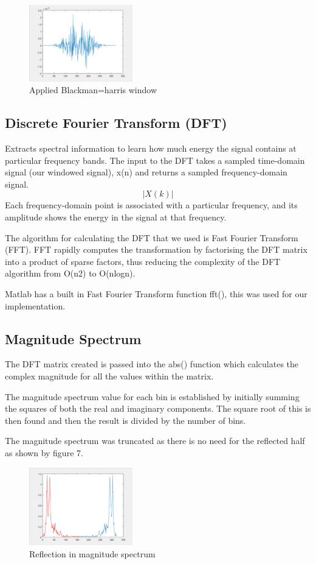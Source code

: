 \documentclass[	DIV=calc,%
							paper=a4,%
							fontsize=9.8pt,%
							twocolumn]{scrartcl}	 					%
\begin{document}
\begin{figure}[ht]
	\centering
	\includegraphics[width=0.4\textwidth]{blackman}
	\captionsetup{justification=centering}
	\caption{Applied Blackman=harris window}
\end{figure}
\subsection{Discrete Fourier Transform (DFT)}
Extracts spectral information to learn how much energy the signal contains at particular frequency bands.
The input to the DFT takes a sampled time-domain signal (our windowed signal), x(n) and returns a sampled frequency-domain signal. \[|X(k)|\]Each frequency-domain point is associated with a particular frequency, and its amplitude shows the energy in the signal at that frequency.

The algorithm for calculating the DFT that we used is Fast Fourier Transform (FFT). FFT rapidly computes the transformation by factorising the DFT matrix into  a product of sparse factors, thus reducing the complexity of the DFT algorithm from O(n2) to O(nlogn).   

Matlab has a built in Fast Fourier Transform function fft(), this was used for our implementation. 

\subsection{Magnitude Spectrum}
The DFT matrix created is passed into the abs() function which calculates the complex magnitude for all the values within the matrix.

The magnitude spectrum value for each bin is established by initially summing the squares of both the real and imaginary components. The square root of this is then found and then the result is divided by the number of bins.

The magnitude spectrum was truncated as there is no need for the reflected half as shown by figure 7.
\begin{figure}[ht]
	\centering
	\includegraphics[width=0.4\textwidth]{mag}
	\captionsetup{justification=centering}
	\caption{Reflection in magnitude spectrum}
\end{figure}
\end{document}
